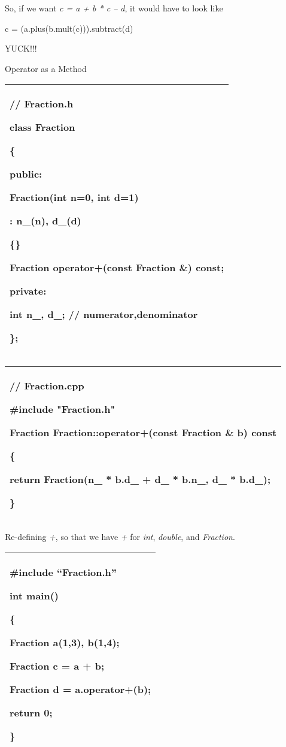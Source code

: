 \documentclass[
]{article}
\begin{document}
So, if we want \emph{c = a + b * c -- d}, it would have to look like

c = (a.plus(b.mult(c))).subtract(d)

YUCK!!!

Operator as a Method

\begin{longtable}[]{@{}l@{}}
\toprule
\endhead
\begin{minipage}[t]{0.97\columnwidth}\raggedright
// Fraction.h

class Fraction

\{

public:

Fraction(int n=0, int d=1)

: n\_(n), d\_(d)

\{\}

Fraction operator+(const Fraction \&) const;

private:

int n\_, d\_; // numerator,denominator

\};\strut
\end{minipage}\tabularnewline
\bottomrule
\end{longtable}

\begin{longtable}[]{@{}l@{}}
\toprule
\endhead
\begin{minipage}[t]{0.97\columnwidth}\raggedright
// Fraction.cpp

\#include "Fraction.h"

Fraction Fraction::operator+(const Fraction \& b) const

\{

return Fraction(n\_ * b.d\_ + d\_ * b.n\_, d\_ * b.d\_);

\} \strut
\end{minipage}\tabularnewline
\bottomrule
\end{longtable}

Re-defining \emph{+}, so that we have \emph{+} for \emph{int},
\emph{double}, and \emph{Fraction}.

\begin{longtable}[]{@{}l@{}}
\toprule
\endhead
\begin{minipage}[t]{0.97\columnwidth}\raggedright
\#include ``Fraction.h''

int main()

\{

Fraction a(1,3), b(1,4);

Fraction c = a + b;

Fraction d = a.operator+(b);

return 0;

\}\strut
\end{minipage}\tabularnewline
\bottomrule
\end{longtable}
\end{document}
